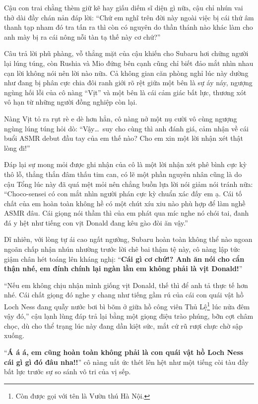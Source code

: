 \documentclass[../main.tex]{subfiles}
\begin{document}
Cậu con trai chằng thèm giữ kẽ hay giấu diếm sĩ diện gì nữa, cậu chỉ nhún vai thở dài đầy chán nản đáp lời: ``Chứ em nghĩ trên đời này ngoài việc bị cái thứ âm thanh tạp nham đó tra tấn ra thì còn có nguyên do thần thánh nào khác làm cho anh mày bị ra cái nông nỗi tàn tạ thế này cơ chứ?''

Câu trả lời phũ phàng, vỗ thẳng mặt của cậu khiến cho Subaru hơi chững người lại lúng túng, còn Rushia và Mio đứng bên cạnh cũng chỉ biết đảo mắt nhìn nhau cạn lời không nói nên lời nào nữa. Cả không gian căn phòng nghỉ lúc này dường như đang bị phân cực chia đôi ranh giới rõ rệt giữa một bên là sự áy náy, ngượng ngùng hối lỗi của cô nàng ``Vịt'' và một bên là cái cảm giác bất lực, thương xót vô hạn từ những người đồng nghiệp còn lại.

Nàng Vịt tỏ ra rụt rè e dè hơn hẳn, cô nàng nở một nụ cười vô cùng ngượng ngùng lúng túng hỏi dò: ``Vậy\dots\ suy cho cùng thì anh đánh giá, cảm nhận về cái buổi ASMR debut đầu tay của em thế nào? Cho em xin một lời nhận xét thật lòng đi!''

Đáp lại sự mong mỏi được ghi nhận của cô là một lời nhận xét phê bình cực kỳ thô lỗ, thẳng thắn đâm thấu tim can, có lẽ một phần nguyên nhân cũng là do cậu Tổng lúc này đã quá mệt mỏi nên chẳng buồn lựa lời nói giảm nói tránh nữa: ``Choco-sensei có con mắt nhìn người phán cực kỳ chuẩn xác đấy em ạ. Cái tố chất của em hoàn toàn không hề có một chút xíu xiu nào phù hợp để làm nghề ASMR đâu. Cái giọng nói thầm thì của em phát qua míc nghe nó chói tai, đanh đá y hệt như tiếng con vịt Donald đang kêu gào đòi ăn vậy.''

Dĩ nhiên, với lòng tự ái cao ngất ngưởng, Subaru hoàn toàn không thể nào ngoan ngoãn chấp nhận nhún nhường trước lời chê bai thậm tệ này, cô nàng lập tức giậm chân hét toáng lên kháng nghị: ``\textbf{Cái gì cơ chứ!? Anh ăn nói cho cẩn thận nhé, em đính chính lại ngàn lần em không phải là vịt Donald!}''

``Nếu em không chịu nhận mình giống vịt Donald, thế thì để anh tả thực tế hơn nhé. Cái chất giọng đó nghe y chang như tiếng gầm rú của cái con quái vật hồ Loch Ness đang quẫy nước bơi bì bõm ở giữa hồ công viên Thủ Lệ\footnote{Còn được gọi với tên là Vườn thú Hà Nội.} lúc nửa đêm vậy đó,'' cậu lạnh lùng đáp trả lại bằng một giọng điệu trào phúng, bỡn cợt châm chọc, dù cho thể trạng lúc này đang dần kiệt sức,  mắt cứ rũ rượi chực chờ sập xuống.

``\textbf{Á á á, em cũng hoàn toàn không phải là con quái vật hồ Loch Ness cái gì gì đó đâu nha!!}'' cô nàng uất ức thét lên hệt như một tiếng còi tàu đầy bất lực trước sự so sánh vô tri của vị sếp.
\end{document}
